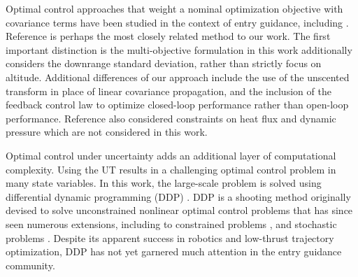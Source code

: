\documentclass[journal ]{new-aiaa}
\begin{document}
Optimal control approaches that weight a nominal optimization objective with covariance terms have been studied in the context of entry guidance, including \cite{AltitudeUnderUncertainty, MarsEntryDesensitized, EntryOUUThesis1, EntryOUUThesis2, EntryOUU}.
Reference \cite{AltitudeUnderUncertainty} is perhaps the most closely related method to our work. The first important distinction is the multi-objective formulation in this work additionally considers the downrange standard deviation, rather than strictly focus on altitude. Additional differences of our approach include the use of the unscented transform in place of linear covariance propagation, and the inclusion of the feedback control law to optimize closed-loop performance rather than open-loop performance. Reference \cite{AltitudeUnderUncertainty} also considered constraints on heat flux and dynamic pressure which are not considered in this work. 

Optimal control under uncertainty adds an additional layer of computational complexity. Using the UT results in a challenging optimal control problem in many state variables. In this work, the large-scale problem is solved using differential dynamic programming (DDP) \cite{DDP}. DDP is a shooting method originally devised to solve unconstrained nonlinear optimal control problems that has since seen numerous extensions, including to constrained problems \cite{DDP_ControlLimited,HDDP1,HDDP2,DDP_NonlinearConstraints,DDP_InteriorPoint}, and stochastic problems \cite{iLQG, DDP_Stochastic, ozaki_UT,ozaki2020tube}. 
Despite its apparent success in robotics and low-thrust trajectory optimization, DDP has not yet garnered much attention in the entry guidance community. 
\end{document}
